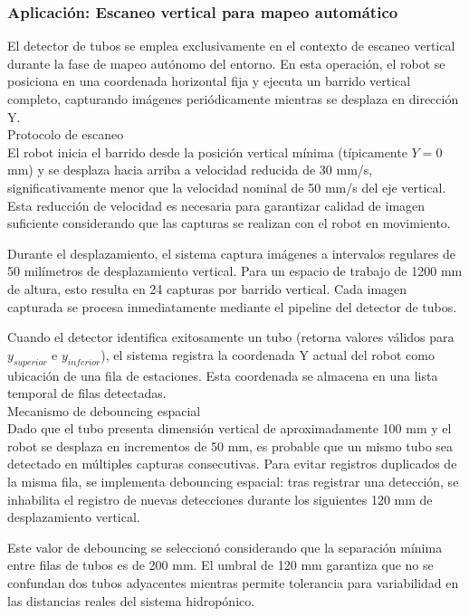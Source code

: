 \subsubsection{Aplicación: Escaneo vertical para mapeo automático}

El detector de tubos se emplea exclusivamente en el contexto de escaneo vertical durante la fase de mapeo autónomo del entorno. En esta operación, el robot se posiciona en una coordenada horizontal fija y ejecuta un barrido vertical completo, capturando imágenes periódicamente mientras se desplaza en dirección Y.\\

Protocolo de escaneo\\
\noindent
El robot inicia el barrido desde la posición vertical mínima (típicamente $Y = 0$ mm) y se desplaza hacia arriba a velocidad reducida de 30 mm/s, significativamente menor que la velocidad nominal de 50 mm/s del eje vertical. Esta reducción de velocidad es necesaria para garantizar calidad de imagen suficiente considerando que las capturas se realizan con el robot en movimiento.

Durante el desplazamiento, el sistema captura imágenes a intervalos regulares de 50 milímetros de desplazamiento vertical. Para un espacio de trabajo de 1200 mm de altura, esto resulta en 24 capturas por barrido vertical. Cada imagen capturada se procesa inmediatamente mediante el pipeline del detector de tubos.

Cuando el detector identifica exitosamente un tubo (retorna valores válidos para $y_{superior}$ e $y_{inferior}$), el sistema registra la coordenada Y actual del robot como ubicación de una fila de estaciones. Esta coordenada se almacena en una lista temporal de filas detectadas.\\

Mecanismo de debouncing espacial\\
\noindent
Dado que el tubo presenta dimensión vertical de aproximadamente 100 mm y el robot se desplaza en incrementos de 50 mm, es probable que un mismo tubo sea detectado en múltiples capturas consecutivas. Para evitar registros duplicados de la misma fila, se implementa debouncing espacial: tras registrar una detección, se inhabilita el registro de nuevas detecciones durante los siguientes 120 mm de desplazamiento vertical.

Este valor de debouncing se seleccionó considerando que la separación mínima entre filas de tubos es de 200 mm. El umbral de 120 mm garantiza que no se confundan dos tubos adyacentes mientras permite tolerancia para variabilidad en las distancias reales del sistema hidropónico.

